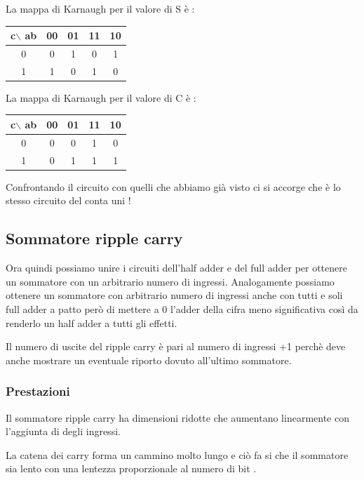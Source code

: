 \documentclass[a4paper]{book}
\begin{document}
La mappa di Karnaugh per il valore di S è :

\begin{tabular}{|c|c|c|c|c|}
\hline
c$\backslash$ ab & 00 & 01 & 11 & 10 \\
\hline
0              & 0  & \cellcolor{yellow}1  &  0 & \cellcolor{yellow}1  \\
\hline
1              & \cellcolor{yellow}1  & 0  & \cellcolor{yellow}1  & 0  \\
\hline
\end{tabular}

La mappa di Karnaugh per il valore di C è :

\begin{tabular}{|c|c|c|c|c|}
\hline
c$\backslash$ ab & 00 & 01 & 11 & 10 \\
\hline
0              & 0  & 0  &  \cellcolor{yellow}1 & 0  \\
\hline
1              & 0  & \cellcolor{yellow}1  & \cellcolor{yellow}1  & \cellcolor{yellow}1  \\
\hline
\end{tabular}

Confrontando il circuito con quelli che abbiamo già visto ci si accorge che è lo stesso circuito del conta uni !

\subsection{Sommatore ripple carry}
Ora quindi possiamo unire i circuiti dell'half adder e del full adder per ottenere un sommatore con un arbitrario numero di ingressi.
Analogamente possiamo ottenere un sommatore con arbitrario numero di ingressi anche con tutti e soli full adder a patto però di mettere a 0 l'adder della cifra meno significativa così da renderlo un half adder a tutti gli effetti.

Il numero di uscite del ripple carry è pari al numero di ingressi +1 perchè deve anche mostrare un eventuale riporto dovuto all'ultimo sommatore.


\subsubsection*{Prestazioni}

Il sommatore ripple carry ha dimensioni ridotte che aumentano linearmente con l'aggiunta di degli ingressi.

La catena dei carry forma un cammino molto lungo e ciò fa si che il sommatore sia lento con una lentezza proporzionale al numero di bit .
\end{document}
